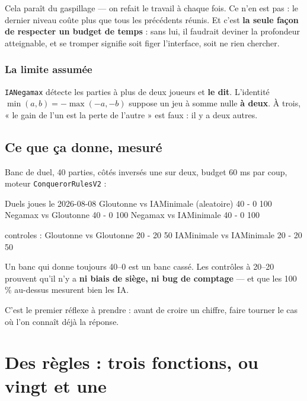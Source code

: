 Cela paraît du gaspillage — on refait le travail à chaque fois. Ce n'en est pas :
le dernier niveau coûte plus que tous les précédents réunis. Et c'est \textbf{la
seule façon de respecter un budget de temps} : sans lui, il faudrait deviner la
profondeur atteignable, et se tromper signifie soit figer l'interface, soit ne
rien chercher.

\subsubsection{La limite assumée}

\texttt{IANegamax} détecte les parties à plus de deux joueurs et \textbf{le
dit}. L'identité $\min(a,b) = -\max(-a,-b)$ suppose un jeu à somme nulle
\textbf{à deux}. À trois, « le gain de l'un est la perte de l'autre » est faux :
il y a deux autres.

\subsection{Ce que ça donne, mesuré}

Banc de duel, 40 parties, côtés inversés une sur deux, budget 60 ms par coup,
moteur \texttt{ConquerorRulesV2} :

\begin{nkcode}{Duels joues le 2026-08-08}
Gloutonne  vs  IAMinimale (aleatoire)     40 - 0     100 %
Negamax    vs  Gloutonne                  40 - 0     100 %
Negamax    vs  IAMinimale                 40 - 0     100 %

controles :
Gloutonne  vs  Gloutonne                  20 - 20     50 %
IAMinimale vs  IAMinimale                 20 - 20     50 %
\end{nkcode}

\begin{nkretenir}
Un banc qui donne toujours 40--0 est un banc cassé. Les contrôles à 20--20
prouvent qu'il n'y a \textbf{ni biais de siège, ni bug de comptage} — et que les
100 \% au-dessus mesurent bien les IA.

C'est le premier réflexe à prendre : avant de croire un chiffre, faire tourner le
cas où l'on connaît déjà la réponse.
\end{nkretenir}

\section{Des règles : trois fonctions, ou vingt et une}

